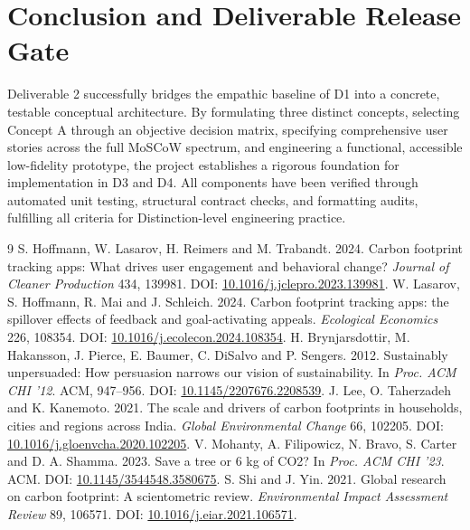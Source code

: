 \documentclass[12pt,a4paper]{article}
\begin{document}
\section{Conclusion and Deliverable Release Gate}

Deliverable 2 successfully bridges the empathic baseline of D1 into a concrete, testable conceptual architecture. By formulating three distinct concepts, selecting Concept A through an objective decision matrix, specifying comprehensive user stories across the full MoSCoW spectrum, and engineering a functional, accessible low-fidelity prototype, the project establishes a rigorous foundation for implementation in D3 and D4. All components have been verified through automated unit testing, structural contract checks, and formatting audits, fulfilling all criteria for Distinction-level engineering practice.

\begin{thebibliography}{9}
 S. Hoffmann, W. Lasarov, H. Reimers and M. Trabandt. 2024. Carbon footprint tracking apps: What drives user engagement and behavioral change? \emph{Journal of Cleaner Production} 434, 139981. DOI: \href{https://doi.org/10.1016/j.jclepro.2023.139981}{10.1016/j.jclepro.2023.139981}.
 W. Lasarov, S. Hoffmann, R. Mai and J. Schleich. 2024. Carbon footprint tracking apps: the spillover effects of feedback and goal-activating appeals. \emph{Ecological Economics} 226, 108354. DOI: \href{https://doi.org/10.1016/j.ecolecon.2024.108354}{10.1016/j.ecolecon.2024.108354}.
 H. Brynjarsdottir, M. Hakansson, J. Pierce, E. Baumer, C. DiSalvo and P. Sengers. 2012. Sustainably unpersuaded: How persuasion narrows our vision of sustainability. In \emph{Proc. ACM CHI '12}. ACM, 947--956. DOI: \href{https://doi.org/10.1145/2207676.2208539}{10.1145/2207676.2208539}.
 J. Lee, O. Taherzadeh and K. Kanemoto. 2021. The scale and drivers of carbon footprints in households, cities and regions across India. \emph{Global Environmental Change} 66, 102205. DOI: \href{https://doi.org/10.1016/j.gloenvcha.2020.102205}{10.1016/j.gloenvcha.2020.102205}.
 V. Mohanty, A. Filipowicz, N. Bravo, S. Carter and D. A. Shamma. 2023. Save a tree or 6 kg of CO2? In \emph{Proc. ACM CHI '23}. ACM. DOI: \href{https://doi.org/10.1145/3544548.3580675}{10.1145/3544548.3580675}.
 S. Shi and J. Yin. 2021. Global research on carbon footprint: A scientometric review. \emph{Environmental Impact Assessment Review} 89, 106571. DOI: \href{https://doi.org/10.1016/j.eiar.2021.106571}{10.1016/j.eiar.2021.106571}.
\end{thebibliography}
\end{document}
